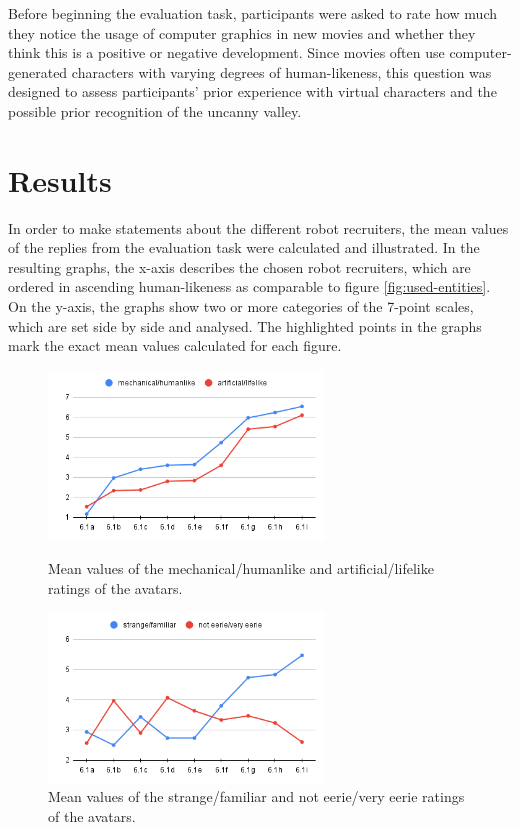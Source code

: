 Before beginning the evaluation task, participants were asked to rate how much they notice the usage of computer graphics in new movies and whether they think this is a positive or negative development. Since movies often use computer-generated characters with varying degrees of human-likeness, this question was designed to assess participants' prior experience with virtual characters and the possible prior recognition of the uncanny valley.


\section{Results}
In order to make statements about the different robot recruiters, the mean values of the replies from the evaluation task were calculated and illustrated. In the resulting graphs, the x-axis describes the chosen robot recruiters, which are ordered in ascending human-likeness as comparable to figure \ref{fig:used-entities}. On the y-axis, the graphs show two or more categories of the 7-point scales, which are set side by side and analysed. The highlighted points in the graphs mark the exact mean values calculated for each figure.\par
\begin{figure} %
    \centering
    \includegraphics[width=0.65\textwidth]{graphics/result/result1.png}
    \caption{Mean values of the mechanical/humanlike and artificial/lifelike ratings of the avatars.}
    \label{fig:humanlikeness}
    \vspace{20pt}
    \centering
    \includegraphics[width=0.65\textwidth]{graphics/result/result2.png}
    \caption{Mean values of the strange/familiar and not eerie/very eerie ratings of the avatars.}
    \label{fig:strangeness}
\end{figure}
